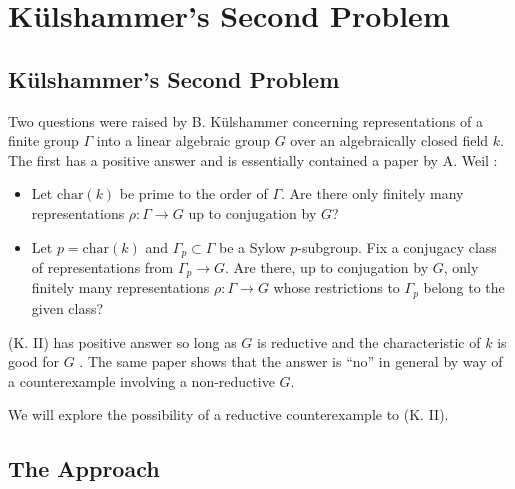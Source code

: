 
\chapter{K\"ulshammer's Second Problem}
\label{Chapter4}


\section{K\"ulshammer's Second Problem}

Two questions were raised by B. K\"ulshammer concerning representations of a finite group $\Gamma$ into a linear algebraic group $G$ over an algebraically closed field $k$. The first has a positive answer  and is essentially contained a paper by A. Weil \cite{weil1964remarks}:
\begin{itemize}
	\item[(K. I)] Let $\mathrm{char}(k)$ be prime to the order of $\Gamma$. Are there only finitely many representations $\rho:\Gamma\rightarrow G$ up to conjugation by $G$?
	\item[(K. II)] Let $p = \mathrm{char}(k)$ and $\Gamma_p \subset  \Gamma$ be a Sylow $p$-subgroup. Fix a conjugacy class of representations from $\Gamma_p\rightarrow G$. Are there, up to conjugation by $G$, only finitely many representations $\rho:\Gamma\rightarrow G$ whose restrictions to $\Gamma_p$ belong to the given class?
\end{itemize}

(K. II) has positive answer so long as $G$ is reductive and the characteristic of $k$ is good for $G$ \cite{slodowy1997two}. The same paper shows that the answer is ``no'' in general by way of a counterexample involving a non-reductive $G$.

We will explore the possibility of a reductive counterexample to (K. II).

\section{The Approach}


